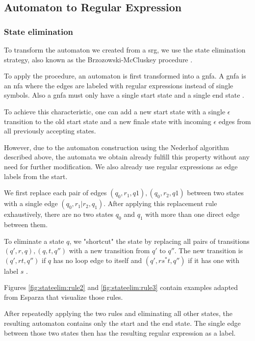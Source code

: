 \subsection{Automaton to Regular Expression}\label{sec:nfa2regex}

\subsubsection{State elimination}

To transform the automaton we created from a \ac{srg}, we use the state elimination strategy, also known as the Brzozowski-McCluskey procedure \cite{brzozowksi_mccluskey}.

To apply the procedure, an automaton is first transformed into a \ac{gnfa}. A \ac{gnfa} is an \ac{nfa} where the edges are labeled with regular expressions instead of single symbols.
Also a \ac{gnfa} must only have a single start state and a single end state \cite{hanGNFA}.

To achieve this characteristic, one can add a new start state with a single $\epsilon$ transition to the old start state and a new finale state with incoming $\epsilon$ edges from all previously accepting states.

However, due to the automaton construction using the Nederhof algorithm described above, the automata we obtain already fulfill this property without any need for further modification.
We also already use regular expressions as edge labels from the start.

We first replace each pair of edges $(q_0, r_1, q1), (q_0, r_2, q1)$ between two states with a single edge $(q_0, r_1|r_2, q_1)$.
After applying this replacement rule exhaustively, there are no two states $q_0$ and $q_1$ with more than one direct edge between them.

To eliminate a state $q$, we "shortcut" the state by replacing all pairs of transitions $(q',r, q), (q, t, q'')$ with a new transition from $q'$ to $q''$.
The new transition is $(q', rt, q'')$ if $q$ has no loop edge to itself and $(q', rs^*t, q'')$ if it has one with label $s$ \cite{esparza}.

Figures \ref{fig:stateelim:rule2} and \ref{fig:stateelim:rule3} contain examples adapted from Esparza \cite{esparza} that visualize those rules.

After repeatedly applying the two rules and eliminating all other states, the resulting automaton contains only the start and the end state. The single edge between those two states then has the resulting regular expression as a label.

